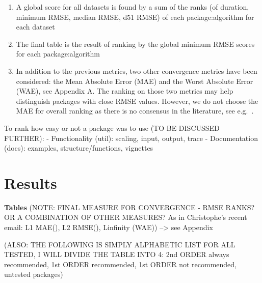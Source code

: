 \begin{enumerate}
\def\labelenumi{\arabic{enumi}.}
\setcounter{enumi}{3}
\tightlist
\item
  A global score for all datasets is found by a sum of the ranks (of
  duration, minimum RMSE, median RMSE, d51 RMSE) of each
  package:algorithm for each dataset
\item
  The final table is the result of ranking by the global minimum RMSE
  scores for each package:algorithm
\item
  In addition to the previous metrics, two other convergence metrics
  have been considered: the Mean Absolute Error (MAE) and the Worst
  Absolute Error (WAE), see Appendix A. The ranking on those two metrics
  may help distinguish packages with close RMSE values. However, we do
  not choose the MAE for overall ranking as there is no consensus in the
  literature, see e.g.~\citep{willmott2005advantages,chai2014root}.
\end{enumerate}

To rank how easy or not a package was to use (TO BE DISCUSSED FURTHER):
- Functionality (util): scaling, input, output, trace - Documentation
(docs): examples, structure/functions, vignettes

\hypertarget{results}{%
\section{Results}\label{results}}

\textbf{Tables} (NOTE: FINAL MEASURE FOR CONVERGENCE - RMSE RANKS? OR A
COMBINATION OF OTHER MEASURES? As in Christophe's recent email: L1
MAE(), L2 RMSE(), Linfinity (WAE)) --\textgreater{} see Appendix

(ALSO: THE FOLLOWING IS SIMPLY ALPHABETIC LIST FOR ALL TESTED, I WILL
DIVIDE THE TABLE INTO 4: 2nd ORDER always recommended, 1st ORDER
recommended, 1st ORDER not recommended, untested packages)

